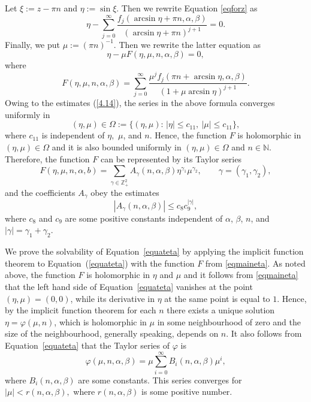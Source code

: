 \documentclass[10pt, a4paper]{article}
\theoremstyle{plain}
\theoremstyle{definition}
\numberwithin{equation}{section}
\def\Om{\Omega}
\def\a{\alpha}
\def\b{\beta}
\begin{document}
Let $\xi:=z-\pi n$ and $\eta:=\sin\xi$. Then we rewrite Equation \eqref{eqforz} as
$$
\eta-\sum\limits_{j=0}^{\infty}
\frac{f_j (\arcsin\eta+\pi n,\alpha, \beta)}{(\arcsin\eta+\pi n)^{j+1}}=0.
$$
Finally, we put $\mu:=(\pi n)^{-1}$. Then we rewrite the latter equation as
\begin{equation}\label{equateta}
\eta-\mu F(\eta, \mu, n,\a,\b)=0,
\end{equation}
where
\begin{equation}\label{eqmaineta}
F(\eta, \mu, n,\a,\b)=\sum\limits_{j=0}^{\infty}
\frac{\mu^j f_j (\pi n+\arcsin\eta,\a,\b)}{(1+\mu\arcsin\eta)^{j+1}}.
\end{equation}
Owing to the estimates (\ref{4.14}), the series in the above formula converges uniformly in \begin{equation*}
(\eta,\mu)\in\Om:=\big\{(\eta,\mu):\, |\eta|\leqslant c_{11},\ |\mu|\leqslant c_{11}\big\},
\end{equation*}
where $c_{11}$ is independent of $\eta,$ $\mu$, and $n$. Hence, the function $F$ is holomorphic in
$(\eta,\mu)\in\Omega$ and it is also bounded uniformly in $(\eta,\mu)\in\Omega$ and $n\in\mathds{N}$.
Therefore, the function $F$ can be represented by its Taylor series
\begin{equation}\label{4.16}
F (\eta, \mu, n,\a,b)=\sum\limits_{\gamma\in\mathds{Z}_+^2}A_\gamma(n,\a,\b)\eta^{\gamma_1}
\mu^{\gamma_2}, \qquad \gamma=(\gamma_1, \gamma_2),
\end{equation}
and the coefficients $A_\gamma$ obey the estimates
\begin{equation}\label{estAgamma}
|A_\gamma(n,\a,\b)|\leqslant c_{8}c_{9}^{|\gamma|},
\end{equation}
where $c_{8}$ and $c_{9}$ are some positive constants independent of $\alpha$, $\beta$, $n$, and $|\gamma|=\gamma_1+\gamma_2$.

We prove the solvability of Equation~\eqref{equateta} by applying the implicit function theorem
\cite[Th.~1.3.5, Rem.~1.3.6]{Narasimhan} to Equation~(\ref{equateta}) with the function $F$ from
\eqref{eqmaineta}. As noted above, the function $F$ is holomorphic in $\eta$ and $\mu$ and
it follows from \eqref{eqmaineta} that the left hand side of Equation~\eqref{equateta} vanishes at the point
$(\eta,\mu)=(0, 0)$, while its derivative in $\eta$ at the same point is equal to $1.$ Hence, by the implicit function theorem
for each $n$ there exists a unique solution $\eta=\varphi(\mu, n)$, which is holomorphic in $\mu$ in some neighbourhood
of zero and the size of the neighbourhood, generally speaking, depends on $n$. It also follows from  Equation~\eqref{equateta}
that the Taylor series of $\varphi$ is
\begin{equation}\label{varphiseries}
\varphi(\mu, n,\a,\b)=\mu\sum\limits_{i=0}^\infty B_i(n,\a,\b)\mu^i,
\end{equation}
where $B_i(n,\a,\b)$ are some constants.
This series converges for $|\mu|<r(n,\a,\b),$ where $r(n,\a,\b)$ is some positive number.
\end{document}
